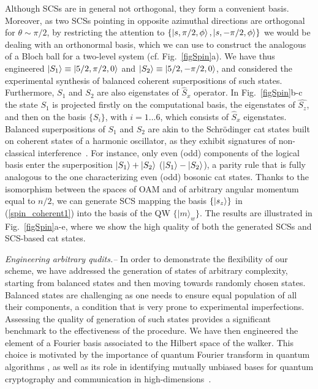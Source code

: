 Although SCSs are in general not orthogonal, they form a convenient basis. Moreover, as two SCSs pointing in opposite azimuthal directions are orthogonal for $\theta\sim\pi/2$, by restricting the attention to $\{\ket{s,\pi/2,\phi},\ket{s,-\pi/2,\phi}\}$ we would be dealing with an orthonormal basis, which we can use to construct the analogous of a Bloch ball for a two-level system (cf. Fig.~\ref{figSpin}a). We have thus engineered $\ket{S_1}\equiv\ket{5/2,\pi/2,0}$ and $\ket{S_2}\equiv\ket{5/2,-\pi/2,0}$, and considered the experimental synthesis of balanced coherent superpositions of such states.
Furthermore, $S_1$ and $S_2$ are also eigenstates of $\hat{S}_x$ operator. In Fig.~\ref{figSpin}b-c the state $S_1$ is projected firstly on the computational basis, the eigenstates of $\hat{S_z}$, and then on the basis $\{S_i\}$, with $i=1...6$, which consists of $\hat{S}_x$ eigenstates. Balanced superpositions of $S_1$ and $S_2$ are akin to the Schr\"odinger cat states built on coherent states of a harmonic oscillator, as they exhibit signatures of non-classical interference~\cite{agarwal1997atomic,SI}. For instance, only even (odd) components of the logical basis enter the superposition $\ket{S_1}+\ket{S_2}$ ($\ket{S_1}-\ket{S_2}$), a parity rule that is fully analogous to the one characterizing even (odd) bosonic cat states. Thanks to the isomorphism between the spaces of OAM and of arbitrary angular momentum equal to $n/2$, we can generate SCS mapping the basis $\{ \ket{s_z}\}$ in (\ref{spin_coherent1}) into the basis of the \ac{QW} $\{|m\rangle_w\}$. The results are illustrated in Fig.~\ref{figSpin}a-e, where we show the high quality of both the generated SCSs and SCS-based cat states. %

\emph{Engineering arbitrary qudits.--} In order to demonstrate the flexibility of our scheme, we have addressed the generation of states of arbitrary complexity, starting from balanced states and then moving towards randomly chosen states. Balanced states are challenging as one needs to ensure equal population of all their components, a condition that is very prone to experimental imperfections. Assessing the quality of generation of such states provides a significant benchmark to the effectiveness of the procedure. We have then engineered the element of a Fourier basis associated to the Hilbert space of the walker. This choice is motivated by the importance of quantum Fourier transform in quantum algorithms \cite{nielsen2002quantum}, as well as its role in identifying mutually unbiased bases for quantum cryptography and communication in high-dimensions~\cite{durt2010mutually,bandyopadhyay2002new,brierley2009constructing,dambrosio2013test}.

